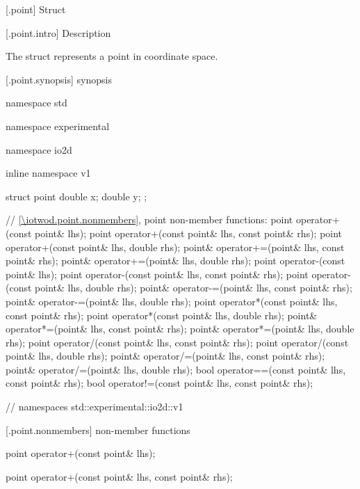  [\iotwod.point] {Struct }

 [\iotwod.point.intro] { Description}

\pnum
{}%
The  struct represents a point in coordinate space.

 [\iotwod.point.synopsis] { synopsis}

\begin{codeblock}
namespace std { namespace experimental { namespace io2d { inline namespace v1 {
  struct point {
    double x;
    double y;
  };
  
  // \ref{\iotwod.point.nonmembers}, point non-member functions:
  point operator+(const point& lhs);
  point operator+(const point& lhs, const point& rhs);
  point operator+(const point& lhs, double rhs);
  point& operator+=(point& lhs, const point& rhs);
  point& operator+=(point& lhs, double rhs);
  point operator-(const point& lhs);
  point operator-(const point& lhs, const point& rhs);
  point operator-(const point& lhs, double rhs);
  point& operator-=(point& lhs, const point& rhs);
  point& operator-=(point& lhs, double rhs);
  point operator*(const point& lhs, const point& rhs);
  point operator*(const point& lhs, double rhs);
  point& operator*=(point& lhs, const point& rhs);
  point& operator*=(point& lhs, double rhs);
  point operator/(const point& lhs, const point& rhs);
  point operator/(const point& lhs, double rhs);
  point& operator/=(point& lhs, const point& rhs);
  point& operator/=(point& lhs, double rhs);
  bool operator==(const point& lhs, const point& rhs);
  bool operator!=(const point& lhs, const point& rhs);
} } } } // namespaces std::experimental::io2d::v1
\end{codeblock}

 [\iotwod.point.nonmembers] { non-member functions}

%
%
\begin{itemdecl}
point operator+(const point& lhs);
\end{itemdecl}
\begin{itemdescr}
	\pnum
	\returns
\end{itemdescr}

%
%
\begin{itemdecl}
point operator+(const point& lhs, const point& rhs);
\end{itemdecl}
\begin{itemdescr}
	\pnum
	\returns
\end{itemdescr}

